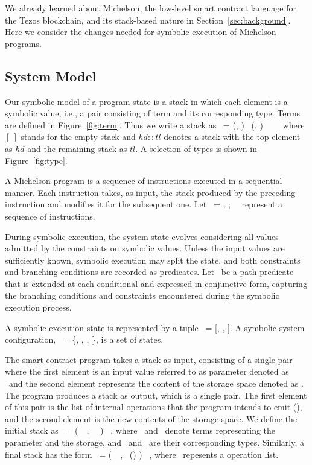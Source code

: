 \documentclass[a4paper,USenglish,cleveref, autoref, thm-restate]{lipics-v2021}
\begin{document}
We already learned about Michelson, the low-level smart contract
language for the Tezos blockchain, and its stack-based nature in
Section~\ref{sec:background}.  Here we consider the changes needed for
symbolic execution of Michelson programs.

\subsection{System Model}
\label{sec:system-model}

Our symbolic model of a program state is a stack in which each element
is a symbolic value, i.e., a pair consisting
of term and its corresponding type. Terms are defined in
Figure~\ref{fig:term}. Thus we write a stack as \STACK\ = (\TermOne,
\TYF) \STACKCONCAT\ (\TermTwo, \TYS) \STACKCONCAT\ \DOT\ \STACKCONCAT\ 
\EMPTYSTACK\ where \ensuremath{[\ ]} stands for the empty stack and
\ensuremath{hd :: tl} denotes a stack with the top element as
\ensuremath{hd} and the remaining stack as \ensuremath{tl}. 
A selection of types is shown in Figure~\ref{fig:type}.


A Michelson program is a sequence of instructions executed in a
sequential manner. Each instruction takes, as input, the stack
produced by the preceding instruction and modifies it for the
subsequent one. Let \INSTRUCTION\ = \InstructionOne; \InstructionTwo;
\DOT\  \InstructionN\ represent a sequence of instructions.

During symbolic execution,  the system state evolves considering all
values admitted by the constraints on symbolic values. Unless the
input values are sufficiently known, symbolic execution may split the
state, and both constraints and branching conditions are recorded as
predicates. Let \PREDICATE\ be a path predicate that is extended at
each conditional and expressed in conjunctive form, capturing the
branching conditions and constraints encountered during the symbolic
execution process. 
\begin{definition}
A symbolic execution state is represented by a tuple \STATE\ =
[\INSTRUCTION, \STACK, \PREDICATE].
A symbolic system configuration, \SYSTEM\ = \{\STATEONE, \STATETWO,
\DOT, \STATEN \}, is a set of  states.
\end{definition}

The smart contract program takes a stack as input, consisting of a
single pair where the first element is an input value referred to as
parameter denoted as \VPAR\ and the second element represents the
content of the storage space denoted as \VSTORAGE. The program
produces a stack as output, which is a single pair. The first element
of this pair is the list of internal operations that the program
intends to emit (\VOPERATIONLIST), and the second element is the new
contents of the storage space.  We define the initial stack as
\SINIT\   = (\KPAIR\ \VPAR\ \VSTORAGE, \TPAIR\ \TYF\ \TYS)
\STACKCONCAT\ \EMPTYSTACK, where \VPAR\ and \VSTORAGE\ denote terms
representing the parameter and the storage, and \TYF\ and \TYS\ are
their corresponding types. Similarly, a final stack has the form
\SFINAL\   = (\PAIR\ \VOPERATIONLIST\ \VSTORAGE, \TPAIR\
(\TOPERATIONLIST) \TYS) \STACKCONCAT\ \EMPTYSTACK, where
\VOPERATIONLIST\ repesents a operation list.
\end{document}
